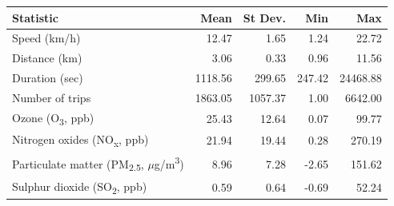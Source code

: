 \begin{tabular}{lrrrr}
\toprule
Statistic & Mean & St Dev. & Min & Max \\
\midrule
Speed (km/h) & 12.47 & 1.65 & 1.24 & 22.72 \\
Distance (km) & 3.06 & 0.33 & 0.96 & 11.56 \\
Duration (sec) & 1118.56 & 299.65 & 247.42 & 24468.88 \\
Number of trips & 1863.05 & 1057.37 & 1.00 & 6642.00 \\
Ozone (O\textsubscript{3}, ppb) & 25.43 & 12.64 & 0.07 & 99.77 \\
Nitrogen oxides (NO\textsubscript{x}, ppb) & 21.94 & 19.44 & 0.28 & 270.19 \\
Particulate matter (PM\textsubscript{2.5}, $\mu$g/m\textsuperscript{3}) & 8.96 & 7.28 & -2.65 & 151.62 \\
Sulphur dioxide (SO\textsubscript{2}, ppb) & 0.59 & 0.64 & -0.69 & 52.24 \\
\bottomrule
\end{tabular}
